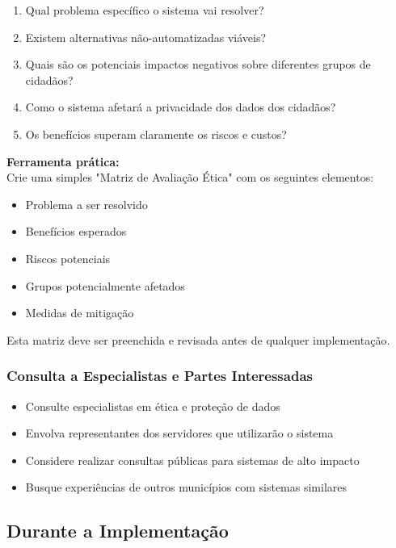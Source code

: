 \documentclass[12pt,a4paper]{article}
\begin{document}
\begin{enumerate}
    \item Qual problema específico o sistema vai resolver?
    \item Existem alternativas não-automatizadas viáveis?
    \item Quais são os potenciais impactos negativos sobre diferentes grupos de cidadãos?
    \item Como o sistema afetará a privacidade dos dados dos cidadãos?
    \item Os benefícios superam claramente os riscos e custos?
\end{enumerate}

\begin{tcolorbox}[highlight]
\textbf{Ferramenta prática:} \\
Crie uma simples "Matriz de Avaliação Ética" com os seguintes elementos:
\begin{itemize}
    \item Problema a ser resolvido
    \item Benefícios esperados
    \item Riscos potenciais
    \item Grupos potencialmente afetados
    \item Medidas de mitigação
\end{itemize}
Esta matriz deve ser preenchida e revisada antes de qualquer implementação.
\end{tcolorbox}

\subsubsection{Consulta a Especialistas e Partes Interessadas}
\begin{itemize}
    \item Consulte especialistas em ética e proteção de dados
    \item Envolva representantes dos servidores que utilizarão o sistema
    \item Considere realizar consultas públicas para sistemas de alto impacto
    \item Busque experiências de outros municípios com sistemas similares
\end{itemize}

\subsection{Durante a Implementação}
\end{document}
